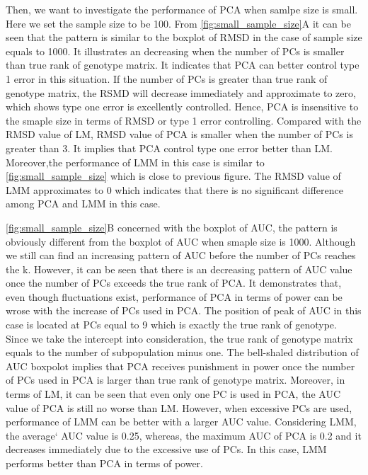 \documentclass[11pt]{article}
\begin{document}
Then, we want to investigate the performance of PCA when samlpe size is small.
Here we set the sample size to be 100.
From \cref{fig:small_sample_size}A it can be seen that the pattern is similar to the boxplot of RMSD in the case of sample size equals to 1000.
It illustrates an decreasing when the number of PCs is smaller than true rank of genotype matrix.
It indicates that PCA can better control type 1 error in this situation.
If the number of PCs is greater than true rank of genotype matrix, the RSMD will decrease immediately and approximate to zero, which shows type one error is excellently controlled.
Hence, PCA is insensitive to the smaple size in terms of RMSD or type 1 error controlling.
Compared with the RMSD value of LM, RMSD value of PCA is smaller when the number of PCs is greater than 3.
It implies that PCA control type one error better than LM.
Moreover,the performance of LMM in this case is similar to \cref{fig:small_sample_size} which is close to previous figure.
The RMSD value of LMM approximates to 0 which indicates that there is no significant difference among PCA and LMM in this case.

\cref{fig:small_sample_size}B concerned with the boxplot of AUC, the pattern is obviously different from the boxplot of AUC when smaple size is 1000.
Although we still can find an increasing pattern of AUC before the number of PCs reaches the k.
However, it can be seen that there is an decreasing pattern of AUC value once the number of PCs exceeds the true rank of PCA.
It demonstrates that, even though fluctuations exist, performance of PCA in terms of power can be wrose with the increase of PCs used in PCA.
The position of peak of AUC in this case is located at PCs equal to 9 which is exactly the true rank of genotype.
Since we take the intercept into consideration, the true rank of genotype matrix equals to the number of subpopulation minus one.
The bell-shaled distribution of AUC boxpolot implies that PCA receives punishment in power once the number of PCs used in PCA is larger than true rank of genotype matrix.
Moreover, in terms of LM, it can be seen that even only one PC is used in PCA, the AUC value of PCA is still no worse than LM.
However, when excessive PCs are used, performance of LMM can be better with a larger AUC value.
Considering LMM, the average` AUC value is 0.25, whereas, the maximum AUC of PCA is 0.2 and it decreases immediately due to the excessive use of PCs.
In this case, LMM performs better than PCA in terms of power. 
\end{document}
